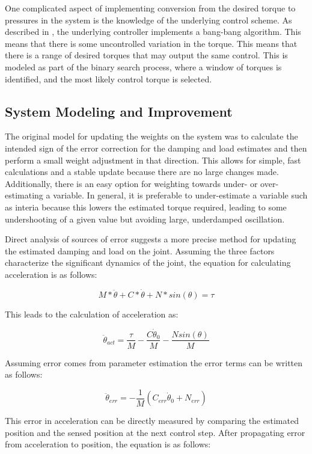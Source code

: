 \documentclass[letterpaper, 10 pt, conference]{IEEEconf} %
\newcommand{\bbss}[1]{\subsection{#1}}
\begin{document}
One complicated aspect of implementing conversion from the desired torque to 
pressures in the system is the
knowledge of the underlying control scheme. As described in \cite{HuntPMuscles},
the underlying controller implements a bang-bang algorithm. This means that 
there is some uncontrolled variation in the torque. This means that there is a
range of desired torques that may output the same control. This is modeled as
part of the binary search process, where a window of torques is identified, and
the most likely control torque is selected.

\bbss{System Modeling and Improvement}

The original model for updating the weights on the system was to calculate the
intended sign of the error correction for the damping and load estimates and 
then perform a small weight adjustment in that direction. This allows for 
simple, fast calculations and a stable update because there are no large 
changes made. Additionally, there is an easy option for weighting towards 
under- or over-estimating a variable. In general, it is preferable to 
under-estimate a variable such as interia because this lowers the estimated 
torque required, leading to some undershooting of a given value but avoiding
large, underdamped oscillation.

Direct analysis of sources of error suggests a more precise method for updating
the estimated damping and load on the joint. Assuming the three factors characterize the significant dynamics of the joint, the equation for calculating acceleration is as follows:

\begin{equation}
M * \ddot{\theta} + C * \dot{\theta} + N * sin(\theta) = \tau
\end{equation}

This leads to the calculation of acceleration as:

\begin{equation}
\ddot{\theta}_{act} = \dfrac{\tau}{M} - \dfrac{C \dot{\theta}_{0}}{M} - \dfrac{N sin(\theta)}{M}
\end{equation}

Assuming error comes from parameter estimation the error terms can be written as
follows:

\begin{equation}
\ddot{\theta}_{err} = - \dfrac{1}{M}
(C_{err} \dot{\theta}_{0} + N_{err})
\end{equation}

This error in acceleration can be directly measured by comparing the estimated
position and the sensed position at the next control step. After propagating error from acceleration to position, the equation is as follows:
\end{document}
